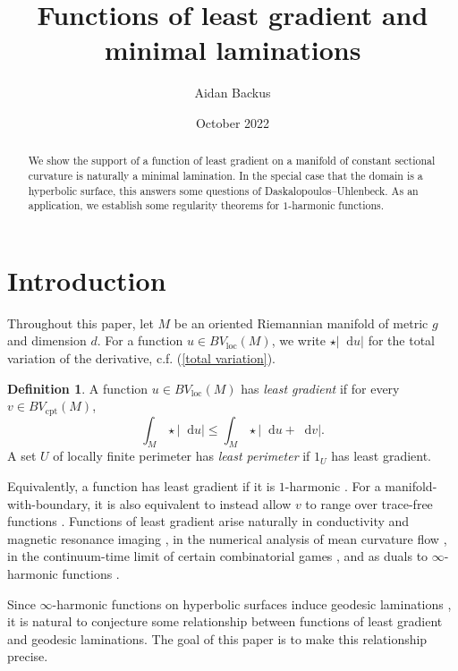 \documentclass[reqno,11pt]{amsart}
\title{Functions of least gradient and minimal laminations}
\author{Aidan Backus}
\date{October 2022}
\newcommand*\dif{\mathop{}\!\mathrm{d}}
\newcommand{\dfn}[1]{\emph{#1}\index{#1}}
\newcommand{\loc}{\mathrm{loc}}
\newcommand{\cpt}{\mathrm{cpt}}
\theoremstyle{definition}
\newtheorem{definition}[theorem]{Definition}
\numberwithin{equation}{section}
\begin{document}
\begin{abstract}
We show the support of a function of least gradient on a manifold of constant sectional curvature is naturally a minimal lamination.
In the special case that the domain is a hyperbolic surface, this answers some questions of Daskalopoulos--Uhlenbeck.
As an application, we establish some regularity theorems for $1$-harmonic functions.
\end{abstract}

\maketitle



\section{Introduction}
Throughout this paper, let $M$ be an oriented Riemannian manifold of metric $g$ and dimension $d$.
For a function $u \in BV_\loc(M)$, we write $\star |\dif u|$ for the total variation of the derivative, c.f. (\ref{total variation}).

\begin{definition}\label{main definitions}
A function $u \in BV_\loc(M)$ has \dfn{least gradient} if for every $v \in BV_\cpt(M)$,
\begin{equation}\label{least gradient functional}
\int_M \star |\dif u| \leq \int_M \star |\dif u + \dif v|.
\end{equation}
A set $U$ of locally finite perimeter has \dfn{least perimeter} if $1_U$ has least gradient.
\end{definition}

Equivalently, a function has least gradient if it is $1$-harmonic \cite{Mazon14}. For a manifold-with-boundary, it is also equivalent to instead allow $v$ to range over trace-free functions \cite[Theorem 2.2]{Sternberg93}.
Functions of least gradient arise naturally in conductivity and magnetic resonance imaging \cite{Tamasan2019, Joy09}, in the numerical analysis of mean curvature flow \cite{Thomas05}, in the continuum-time limit of certain combinatorial games \cite{Kohn06}, and as duals to $\infty$-harmonic functions \cite{daskalopoulos2020transverse}.

Since $\infty$-harmonic functions on hyperbolic surfaces induce geodesic laminations \cite{daskalopoulos2020transverse}, it is natural to conjecture some relationship between functions of least gradient and geodesic laminations.
The goal of this paper is to make this relationship precise.
\end{document}
